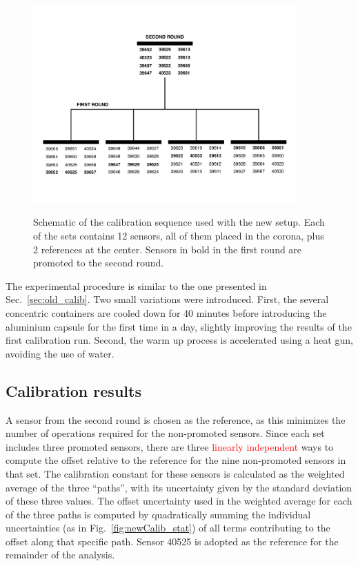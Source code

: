 \label{sec:newCalibrationStrategy}
\begin{figure}[htbp]
\centering
{\includegraphics[width=0.9\textwidth]{images/figure_18.pdf}}
\caption{Schematic of the calibration sequence used with the new setup. Each of the sets contains 12 sensors, all of them placed in the corona, plus 2 references at the center. Sensors in bold in the first round are promoted to the second round.}
\label{fig:newCalibrationStrategy}
\end{figure}

The experimental procedure is similar to the one presented in Sec.~\ref{sec:old_calib}. Two small variations were introduced. First, the several concentric containers are cooled down for 40 minutes before introducing the aluminium capsule for the first time in a day, slightly improving the results of the first calibration run. Second, the warm up process is accelerated using a heat gun, avoiding the use of water.

\subsection{Calibration results}
\label{sec:new_calib_results}

\noindent A sensor from the second round is chosen as the reference, as this minimizes the number of operations required for the non-promoted sensors. Since each set includes three promoted sensors, there are three \textcolor{red}{linearly independent} ways to compute the offset relative to the reference for the nine non-promoted sensors in that set. The calibration constant for these sensors is calculated as the weighted average of the three “paths”, with its uncertainty given by the standard deviation of these three values. The offset uncertainty used in the weighted average for each of the three paths is computed by quadratically summing the individual uncertainties (as in Fig.~\ref{fig:newCalib_stat}) of all terms contributing to the offset along that specific path. Sensor 40525 is adopted as the reference for the remainder of the analysis.


